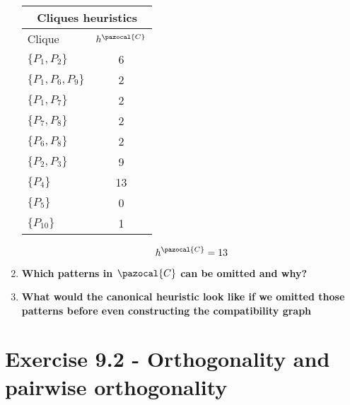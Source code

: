 \documentclass[11pt,a4paper]{article}
\begin{document}
\begin{enumerate}[label=(\alph*), listparindent=1.5em]
\begin{multicols}{3}
		\begin{tabular}{l | c}
			\multicolumn{2}{c}{Cliques heuristics} \\
			\hline \hline
			Clique & $h^{\pazocal{C}}$\\
			\hline
			$\{P_1,P_2\}$ 		& 6 \\
			$\{P_1, P_6, P_9\}$ & 2 \\
			$\{P_1, P_7\}$ 		& 2 \\
			$\{P_7,P_8\}$ 		& 2 \\
			$\{P_6, P_8\}$ 		& 2 \\
			$\{P_2, P_3\}$ 		& 9 \\
			$\{P_4\}$ 	  		& 13\\
			$\{P_5\}$ 			& 0 \\
			$\{P_{10}\}$		& 1
		\end{tabular}

		\[ h^{\pazocal{C}}=13\]
	\end{multicols}
	\item \textbf{Which patterns in $\pazocal{C}$ can be omitted and why?}
	\item \textbf{What would the canonical heuristic look like if we omitted
	those patterns before even constructing the compatibility graph}
\end{enumerate}

\section*{Exercise 9.2 - Orthogonality and pairwise orthogonality}
\end{document}
